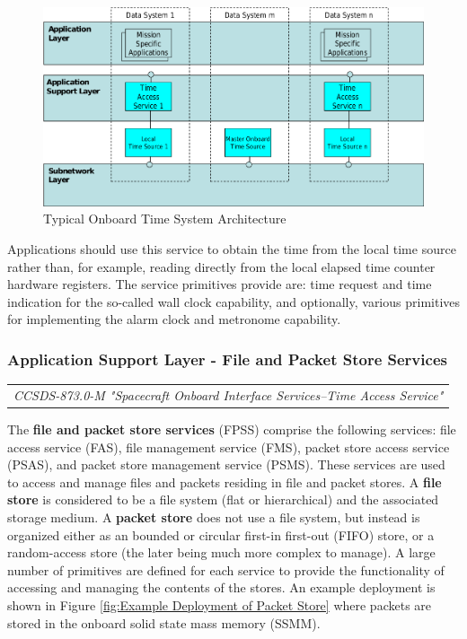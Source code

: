 \begin{figure}[h]
\centering\includegraphics[scale=0.3]{fig/typical_onboard_time_system_architecture}
\caption{Typical Onboard Time System Architecture}
\label{fig:Typical Onboard Time System Architecture}
\end{figure}

Applications should use this service to obtain the time from the local time source rather than, for example, reading directly from the local elapsed time counter hardware registers. The service primitives provide are: time request and time indication for the so-called wall clock capability, and optionally, various primitives for implementing the alarm clock and metronome capability. 

\subsubsection{Application Support Layer - File and Packet Store Services}

\begin{tabular}{l}
\textit{CCSDS-873.0-M "Spacecraft Onboard Interface Services--Time Access Service" \cite{}} 
\end{tabular}

The \textbf{file and packet store services} (FPSS) comprise the following services: file access service (FAS), file management service (FMS), packet store access service (PSAS), and packet store management service (PSMS). These services are used to access and manage files and packets residing in file and packet stores. A \textbf{file store} is considered to be a file system (flat or hierarchical) and the associated storage medium. A \textbf{packet store} does not use a file system, but instead is organized either as an bounded or circular first-in first-out (FIFO) store, or a random-access store (the later being much more complex to manage). A large number of primitives are defined for each service to provide the functionality of accessing and managing the contents of the stores. An example deployment is shown in Figure \ref{fig:Example Deployment of Packet Store} where packets are stored in the onboard solid state mass memory (SSMM).

